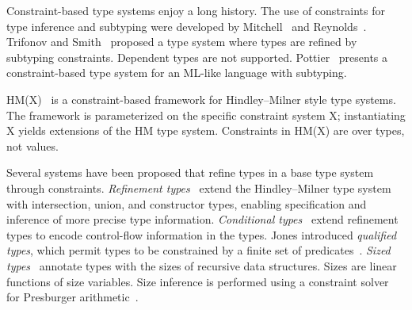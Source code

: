 Constraint-based type systems enjoy a long history.
The use of constraints for type inference and subtyping were
developed by
Mitchell~\cite{mitchell84}
and
Reynolds~\cite{reynolds85}.
%
Trifonov and Smith~\cite{trifonov96}
proposed a type system where types are refined by subtyping
constraints.  Dependent types are not supported.
%
Pottier~\cite{pottier96simplifying,pottier01b}
presents a constraint-based type system for an ML-like language with
subtyping.

HM(X)~\cite{sulzmann97type,pottier01a,pottier-remy-attapl}
is a constraint-based framework
for Hindley--Milner style type systems.
The framework is parameterized on the specific constraint system
X; instantiating X yields extensions of the HM type system.
Constraints in HM(X) are over types, not values.
%












Several systems have been proposed that refine types in a base
type system through constraints.
%
{\em Refinement types}~\cite{refinement-types} extend the 
Hindley--Milner type system with intersection, union, and
constructor types, enabling specification and inference of
more precise type information.
%
{\em Conditional
types}~\cite{conditional-types} extend refinement types to
encode control-flow information in the types.
%
Jones introduced {\em qualified types}, which permit
types to be constrained by a finite set of
predicates~\cite{jones94}.
%
{\em Sized types}~\cite{sized-types}
annotate types with the sizes of recursive data structures.
Sizes are linear functions of size variables.
Size inference is performed using a constraint solver for
Presburger arithmetic~\cite{omega}.

